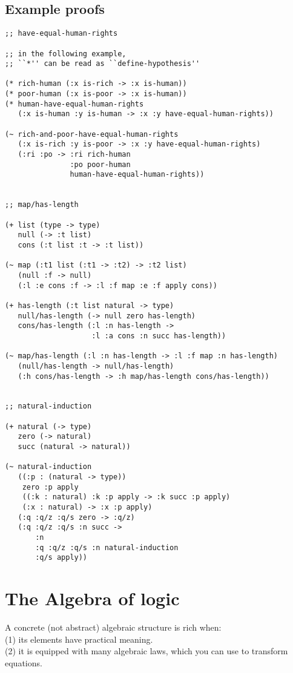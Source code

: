 \documentclass[numbers]{sigplanconf}
\begin{document}
\newpage

\subsection{Example proofs}

{\scriptsize\begin{verbatim}
;; have-equal-human-rights

;; in the following example,
;; ``*'' can be read as ``define-hypothesis''

(* rich-human (:x is-rich -> :x is-human))
(* poor-human (:x is-poor -> :x is-human))
(* human-have-equal-human-rights
   (:x is-human :y is-human -> :x :y have-equal-human-rights))

(~ rich-and-poor-have-equal-human-rights
   (:x is-rich :y is-poor -> :x :y have-equal-human-rights)
   (:ri :po -> :ri rich-human
               :po poor-human
               human-have-equal-human-rights))


;; map/has-length

(+ list (type -> type)
   null (-> :t list)
   cons (:t list :t -> :t list))

(~ map (:t1 list (:t1 -> :t2) -> :t2 list)
   (null :f -> null)
   (:l :e cons :f -> :l :f map :e :f apply cons))

(+ has-length (:t list natural -> type)
   null/has-length (-> null zero has-length)
   cons/has-length (:l :n has-length ->
                    :l :a cons :n succ has-length))

(~ map/has-length (:l :n has-length -> :l :f map :n has-length)
   (null/has-length -> null/has-length)
   (:h cons/has-length -> :h map/has-length cons/has-length))


;; natural-induction

(+ natural (-> type)
   zero (-> natural)
   succ (natural -> natural))

(~ natural-induction
   ((:p : (natural -> type))
    zero :p apply
    ((:k : natural) :k :p apply -> :k succ :p apply)
    (:x : natural) -> :x :p apply)
   (:q :q/z :q/s zero -> :q/z)
   (:q :q/z :q/s :n succ ->
       :n
       :q :q/z :q/s :n natural-induction
       :q/s apply))
\end{verbatim}}

\section{The Algebra of logic}

A concrete (not abstract) algebraic structure is rich when: \\
(1) its elements have practical meaning. \\
(2) it is equipped with many algebraic laws, which you can use to transform equations.
\end{document}
